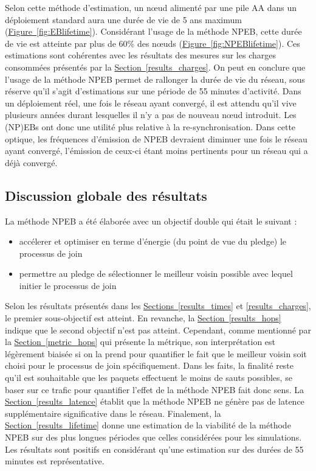\documentclass[]{report}
\newcommand{\wordlink}[2]{\hyperref[#2]{#1~\ref{#2}}}
\begin{document}
\vspace{0.2cm}

Selon cette méthode d'estimation, un nœud alimenté par une pile AA dans un déploiement standard aura une durée de vie de 5 ans maximum (\wordlink{Figure}{fig:EBlifetime}). Considérant l'usage de la méthode NPEB, cette durée de vie est atteinte par plus de 60\% des nœuds (\wordlink{Figure}{fig:NPEBlifetime}). Ces estimations sont cohérentes avec les résultats des mesures sur les charges consommées présentés par la \wordlink{Section}{results_charges}. On peut en conclure que l'usage de la méthode NPEB permet de rallonger la durée de vie du réseau, sous réserve qu'il s'agit d'estimations sur une période de 55 minutes d'activité. Dans un déploiement réel, une fois le réseau ayant convergé, il est attendu qu'il vive plusieurs années durant lesquelles il n'y a pas de nouveau nœud introduit. Les (NP)EBs ont donc une utilité plus relative à la re-synchronisation. Dans cette optique, les fréquences d'émission de NPEB devraient diminuer une fois le réseau ayant convergé, l'émission de ceux-ci étant moins pertinents pour un réseau qui a déjà convergé.

\newpage

\subsection{Discussion globale des résultats} 

La méthode NPEB a été élaborée avec un objectif double qui était le suivant :
\begin{itemize}[label=$\bullet$]
\item accélerer et optimiser en terme d'énergie (du point de vue du pledge) le processus de join
\item permettre au pledge de sélectionner le meilleur voisin possible avec lequel initier le processus de join
\end{itemize}

\vspace{0.3cm}

Selon les résultats présentés dans les \wordlink{Sections}{results_times} et \ref{results_charges}, le premier sous-objectif est atteint. En revanche, la \wordlink{Section}{results_hops} indique que le second objectif n'est pas atteint. Cependant, comme mentionné par la \wordlink{Section}{metric_hops} qui présente la métrique, son interprétation est légèrement biaisée si on la prend pour quantifier le fait que le meilleur voisin soit choisi pour le processus de join spécifiquement. Dans les faits, la finalité reste qu'il est souhaitable que les paquets effectuent le moins de sauts possibles, se baser sur ce trafic pour quantifier l'effet de la méthode NPEB fait donc sens. La \wordlink{Section}{results_latence} établit que la méthode NPEB ne génère pas de latence supplémentaire significative dans le réseau. Finalement, la \wordlink{Section}{results_lifetime} donne une estimation de la viabilité de la méthode NPEB sur des plus longues périodes que celles considérées pour les simulations. Les résultats sont positifs en considérant qu'une estimation sur des durées de 55 minutes est représentative.\\
\end{document}
